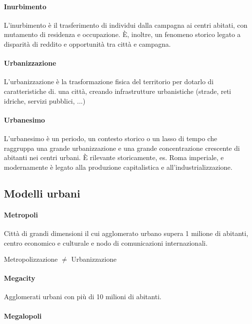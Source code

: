 \documentclass{article}
\begin{document}
\paragraph*{Inurbimento} \phantom{}

L'inurbimento è il trasferimento di individui dalla campagna ai centri abitati, con mutamento
di residenza e occupazione. È, inoltre, un fenomeno storico legato a disparità di reddito e
opportunità tra città e campagna.

\paragraph*{Urbanizzazione} \phantom{}

L'urbanizzazione è la trasformazione fisica del territorio per dotarlo di caratteristiche di.
una città, creando infrastrutture urbanistiche (strade, reti idriche, servizi pubblici, ...)

\paragraph*{Urbanesimo} \phantom{}

L'urbanesimo è un periodo, un contesto storico o un lasso di tempo che raggruppa una grande
urbanizzazione e una grande concentrazione crescente di abitanti nei centri urbani.
È rilevante storicamente, es. Roma imperiale, e modernamente è legato alla produzione
capitalistica e all'industrializzazione.

\subsection{Modelli urbani}
\paragraph*{Metropoli} \phantom{}

Città di grandi dimensioni il cui agglomerato urbano supera 1 milione di abitanti, centro
economico e culturale e nodo di comunicazioni internazionali.

Metropolizzazione $\neq$ Urbanizzazione

\paragraph*{Megacity} \phantom{}

Agglomerati urbani con più di 10 milioni di abitanti.

\paragraph*{Megalopoli} \phantom{}
\end{document}
